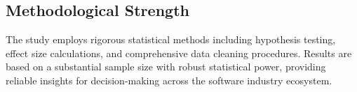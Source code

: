 \subsection*{Methodological Strength}

The study employs rigorous statistical methods including hypothesis testing, effect size calculations, and comprehensive data cleaning procedures. Results are based on a substantial sample size with robust statistical power, providing reliable insights for decision-making across the software industry ecosystem.
